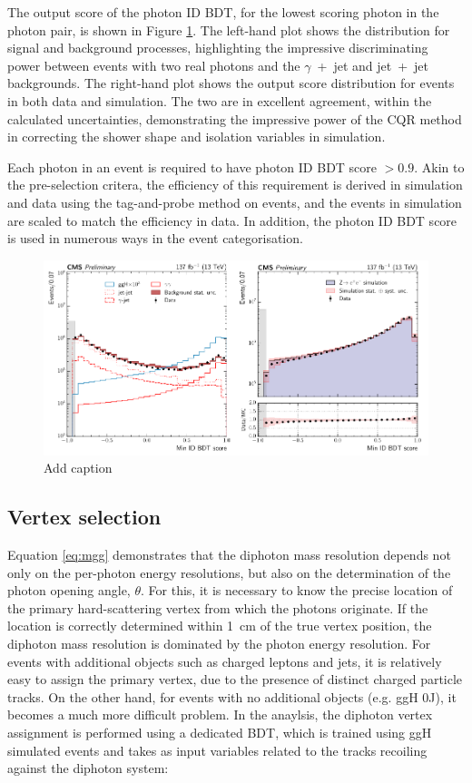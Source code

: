 The output score of the photon ID BDT, for the lowest scoring photon in the photon pair, is shown in Figure \ref{fig:photon_id_1}. The left-hand plot shows the distribution for signal and background processes, highlighting the impressive discriminating power between events with two real photons and the $\gamma$~+~jet and jet~+~jet backgrounds. The right-hand plot shows the output score distribution for \Zee events in both data and simulation. The two are in excellent agreement, within the calculated uncertainties, demonstrating the impressive power of the CQR method in correcting the shower shape and isolation variables in simulation. 

Each photon in an event is required to have photon ID BDT score $>0.9$. Akin to the pre-selection critera, the efficiency of this requirement is derived in simulation and data using the tag-and-probe method on \Zee events, and the events in simulation are scaled to match the efficiency in data. In addition, the photon ID BDT score is used in numerous ways in the event categorisation.

\begin{figure}[hptb]
  \centering
  \includegraphics[width=1\textwidth]{Figures/hgg_overview/photon_id_0.pdf}
  \caption[Photon ID output score distributions]
  {
    Add caption
  }
  \label{fig:photon_id_1}
\end{figure}

\subsection{Vertex selection}
Equation \ref{eq:mgg} demonstrates that the diphoton mass resolution depends not only on the per-photon energy resolutions, but also on the determination of the photon opening angle, $\theta$. For this, it is necessary to know the precise location of the primary hard-scattering vertex from which the photons originate. If the location is correctly determined within 1~cm of the true vertex position, the diphoton mass resolution is dominated by the photon energy resolution. For events with additional objects such as charged leptons and jets, it is relatively easy to assign the primary vertex, due to the presence of distinct charged particle tracks. On the other hand, for \Hgg events with no additional objects (e.g. ggH 0J), it becomes a much more difficult problem. In the \Hgg anaylsis, the diphoton vertex assignment is performed using a dedicated BDT, which is trained using ggH \Hgg simulated events and takes as input variables related to the tracks recoiling against the diphoton system:

